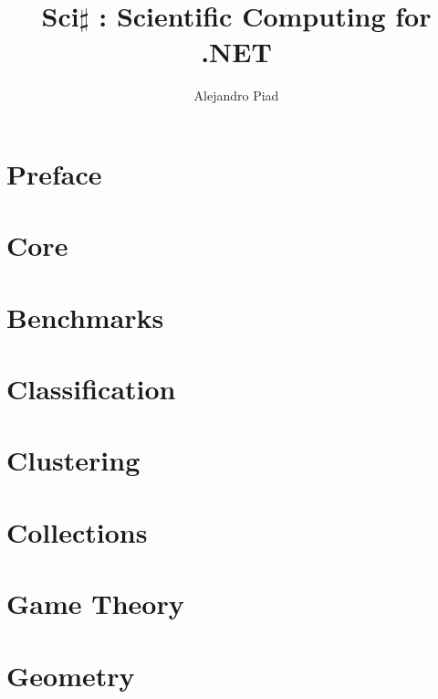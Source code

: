\documentclass[10pt,a4paper]{report}
\author{Alejandro Piad}
\title{\Huge Sci$\sharp$ : Scientific Computing for .NET}
\begin{document}

\maketitle
\tableofcontents

\chapter*{Preface}
 

\chapter{Core}
 

\chapter{Benchmarks}

\chapter{Classification}

\chapter{Clustering}

\chapter{Collections}

\chapter{Game Theory}

\chapter{Geometry}
\end{document}
